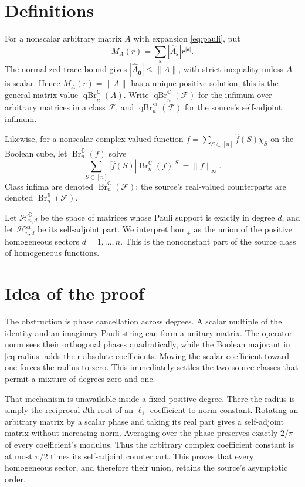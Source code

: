 \documentclass[11pt]{article}
\theoremstyle{remark}
\newcommand{\C}{\mathbb C}
\newcommand{\R}{\mathbb R}
\newcommand{\qBr}{\operatorname{qBr}}
\newcommand{\Br}{\operatorname{Br}}
\newcommand{\sa}{\mathrm{sa}}
\newcommand{\homc}{\mathrm{hom}}
\begin{document}
\section{Definitions}

For a nonscalar arbitrary matrix $A$ with expansion \eqref{eq:pauli}, put
\[
 M_A(r)=\sum_{\mathbf s}|\widehat A_{\mathbf s}|r^{|\mathbf s|}.
\]
The normalized trace bound gives
$|\widehat A_{\mathbf0}|\leq\|A\|$, with strict inequality unless $A$ is
scalar.  Hence $M_A(r)=\|A\|$ has a unique positive solution; this is the
general-matrix value $\qBr_n^{\C}(A)$.  Write $\qBr_n^{\C}(\mathcal F)$ for
the infimum over arbitrary matrices in a class $\mathcal F$, and
$\qBr_n^{\sa}(\mathcal F)$ for the source's self-adjoint infimum.

Likewise, for a nonscalar complex-valued function
$f=\sum_{S\subset[n]}\widehat f(S)\chi_S$ on the Boolean cube, let
$\Br_n^{\C}(f)$ solve
\[
 \sum_{S\subset[n]}|\widehat f(S)|\Br_n^{\C}(f)^{|S|}
 =\|f\|_\infty.
\]
Class infima are denoted $\Br_n^{\C}(\mathcal F)$; the source's real-valued
counterparts are denoted $\Br_n^{\R}(\mathcal F)$.

Let $\mathcal H_{n,d}^{\C}$ be the space of matrices whose Pauli support is
exactly in degree $d$, and let $\mathcal H_{n,d}^{\sa}$ be its self-adjoint
part.  We interpret $\homc_+$ as the union of the positive homogeneous
sectors $d=1,\ldots,n$.  This is the nonconstant part of the source class of
homogeneous functions.

\section{Idea of the proof}

The obstruction is phase cancellation across degrees.  A scalar multiple of
the identity and an imaginary Pauli string can form a unitary matrix.  The
operator norm sees their orthogonal phases quadratically, while the Boolean
majorant in \eqref{eq:radius} adds their absolute coefficients.  Moving the
scalar coefficient toward one forces the radius to zero.  This immediately
settles the two source classes that permit a mixture of degrees zero and one.

That mechanism is unavailable inside a fixed positive degree.  There the
radius is simply the reciprocal $d$th root of an $\ell_1$ coefficient-to-norm
constant.  Rotating an arbitrary matrix by a scalar phase and taking its real
part gives a self-adjoint matrix without increasing norm.  Averaging over the
phase preserves exactly $2/\pi$ of every coefficient's modulus.  Thus the
arbitrary complex coefficient constant is at most $\pi/2$ times its
self-adjoint counterpart.  This proves that every homogeneous sector, and
therefore their union, retains the source's asymptotic order.
\end{document}
